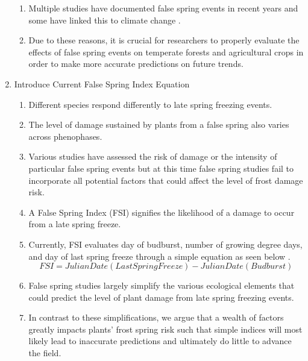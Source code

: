 \documentclass{article}\usepackage[]{graphicx}\usepackage[]{color}
\begin{document}
\begin{enumerate}
\begin{enumerate}
\item Multiple studies have documented false spring events in recent years \citep{Gu2008, Augspurger2009, Knudson2012, Augspurger2013} and some have linked this to climate change \citep{Ault2013, Allstadt2015, Muffler2016, Xin2016}. 
\item Due to these reasons, it is crucial for researchers to properly evaluate the effects of false spring events on temperate forests and agricultural crops in order to make more accurate predictions on future trends.
\end{enumerate}

\item Introduce Current False Spring Index Equation
\begin{enumerate}
\item Different species respond differently to late spring freezing events. 
\item The level of damage sustained by plants from a false spring also varies across phenophases. 
\item Various studies have assessed the risk of damage or the intensity of particular false spring events but at this time false spring studies fail to incorporate all potential factors that could affect the level of frost damage risk. 
\item A False Spring Index (FSI) signifies the likelihood of a damage to occur from a late spring freeze. 
\item Currently, FSI evaluates day of budburst, number of growing degree days, and day of last spring freeze through a simple equation as seen below \citep{Marino2011}. 
\begin{equation} \label{eq:1}
FSI = Julian Date (Last Spring Freeze) - Julian Date (Budburst)
\end{equation}
\item False spring studies largely simplify the various ecological elements that could predict the level of plant damage from late spring freezing events. 
\item In contrast to these simplifications, we argue that a wealth of factors greatly impacts plants' frost spring risk such that simple indices will most likely lead to inaccurate predictions and ultimately do little to advance the field. 
\end{enumerate}


\end{enumerate}
\end{document}
